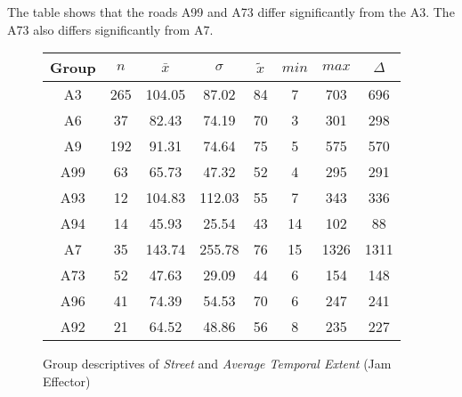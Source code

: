 The table shows that the roads A99 and A73 differ significantly from the A3. The A73 also differs significantly from A7.
\begin{figure}[ht!]
	\centering
	\begin{minipage}{0.5\textwidth}
		\tiny
		\centering
		\begin{tabular}{c|c|c|c|c|c|c|c}
			\toprule
			Group & $n$ & $\bar{x}$ & $\sigma$ & $\tilde{x}$ & $min$ & $max$ & $\Delta$ \\
			\midrule
			A3   & 265 & 104.05 & 87.02  & 84 & 7  & 703  & 696  \\ 
			A6   & 37  & 82.43  & 74.19  & 70 & 3  & 301  & 298  \\ 
			A9   & 192 & 91.31  & 74.64  & 75 & 5  & 575  & 570  \\  
			A99  & 63  & 65.73  & 47.32  & 52 & 4  & 295  & 291  \\ 
			A93  & 12  & 104.83 & 112.03 & 55 & 7  & 343  & 336  \\ 
			A94  & 14  & 45.93  & 25.54  & 43 & 14 & 102  & 88   \\ 
			A7   & 35  & 143.74 & 255.78 & 76 & 15 & 1326 & 1311 \\ 
			A73  & 52  & 47.63  & 29.09  & 44 & 6  & 154  & 148  \\ 
			A96  & 41  & 74.39  & 54.53  & 70 & 6  & 247  & 241  \\ 
			A92  & 21  & 64.52  & 48.86  & 56 & 8  & 235  & 227  \\ 
			\bottomrule
		\end{tabular}
		\label{tbl:descriptives_baysis_effector_Street_TAvg}
	\end{minipage}%
	\begin{minipage}{0.55\textwidth}
		\data
		\pgfplotstablesort[sort key=mean, sort cmp=float >]{\datasorted}{\data}
        \tiny
        \centering
		\label{fig:descriptives_baysis_effector_Street_TAvg}
	\end{minipage}%
	\caption{Group descriptives of \textit{Street} and \textit{Average Temporal Extent} (Jam Effector)}
\end{figure}
